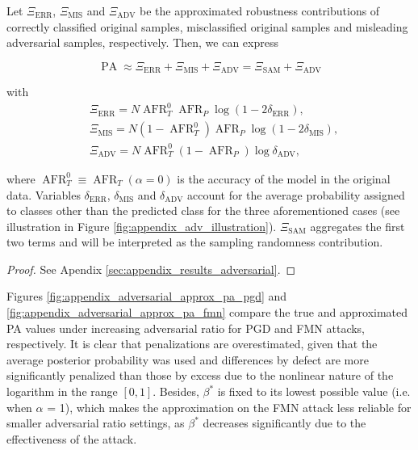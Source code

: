 \begin{theorem}
    Let $\Xi_{\text{ERR}}$, $\Xi_{\text{MIS}}$ and $\Xi_{\text{ADV}}$ be the approximated robustness
    contributions of correctly classified original samples, misclassified original samples
    and misleading adversarial samples, respectively. Then, we can express

    $$
    \operatorname{PA} \approx \Xi_{\text{ERR}} + \Xi_{\text{MIS}} + \Xi_{\text{ADV}} = \Xi_{\text{SAM}} + \Xi_{\text{ADV}} 
    $$

    with
    $$
    \begin{aligned}
        &\Xi_{\text{ERR}} = N \operatorname{AFR}_T^0 \operatorname{AFR}_P \log \left( 1 - 2\delta_{\text{ERR}} \right), \\
        &\Xi_{\text{MIS}} = N (1- \operatorname{AFR}_T^0) \operatorname{AFR}_P \log \left( 1 - 2\delta_{\text{MIS}} \right), \\
        &\Xi_{\text{ADV}} = N \operatorname{AFR}_T^0 (1 - \operatorname{AFR}_P) \log \delta_{\text{ADV}},
    \end{aligned}
    $$

    where $\operatorname{AFR}_T^0 \equiv \operatorname{AFR}_T(\alpha=0)$ is the accuracy of the model in the original data.
    Variables $\delta_{\text{ERR}}$, $\delta_{\text{MIS}}$ and $\delta_{\text{ADV}}$ account for the 
    average probability assigned to
    classes other than the predicted class for the three aforementioned cases 
    (see illustration in Figure \ref{fig:appendix_adv_illustration}). $\Xi_{\text{SAM}}$ aggregates
    the first two terms and will be interpreted as the sampling randomness contribution.
    \label{thm:approximated_pa}
\end{theorem}
\begin{proof}
    See Apendix \ref{sec:appendix_results_adversarial}.
\end{proof}

Figures \ref{fig:appendix_adversarial_approx_pa_pgd} and \ref{fig:appendix_adversarial_approx_pa_fmn}
compare the true and approximated PA values under increasing adversarial ratio for
PGD and FMN attacks, respectively. It is clear that penalizations are overestimated, 
given that the average posterior probability was used and differences by defect are more 
significantly penalized than those by excess due to the nonlinear nature of the logarithm in 
the range $[0,1]$. Besides, $\beta^{*}$ is fixed to its lowest possible value (i.e. when $\alpha$ = 1),
which makes the approximation on the FMN attack less reliable for smaller adversarial 
ratio settings, as $\beta^{*}$ decreases significantly due to the effectiveness of the attack. \\

